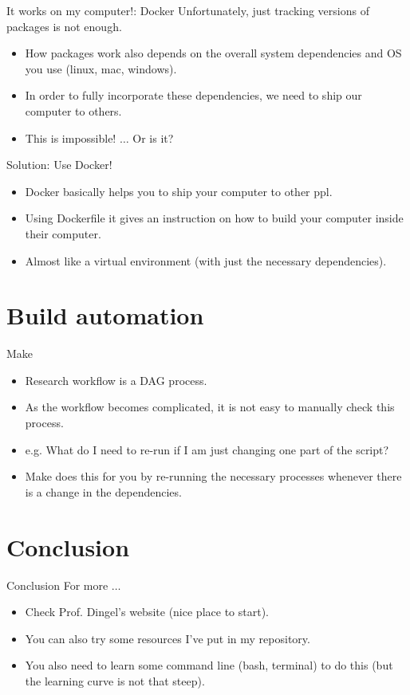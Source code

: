 \documentclass[10pt]{beamer}
\begin{document}
\begin{frame}{It works on my computer!: Docker}
Unfortunately, just tracking versions of packages is not enough.	
\begin{itemize}
	\item How packages work also depends on the overall system dependencies and OS you use (linux, mac, windows).
	\item In order to fully incorporate these dependencies, we need to ship our computer to others.
	\item This is impossible! $\ldots$ Or is it?

\end{itemize}\vspace{5mm}

Solution: Use Docker!
\begin{itemize}
	\item Docker basically helps you to ship your computer to other ppl.
	\item Using Dockerfile it gives an instruction on how to build your computer inside their computer.
	\item Almost like a virtual environment (with just the necessary dependencies).
\end{itemize}
\end{frame}

\section{Build automation}

\begin{frame}{Make}
	\begin{itemize}
		\item Research workflow is a DAG process.
		\item As the workflow becomes complicated, it is not easy to manually check this process.
		\item e.g. What do I need to re-run if I am just changing one part of the script?
		\item Make does this for you by re-running the necessary processes whenever there is a change in the dependencies.
	\end{itemize}
\end{frame}

\section{Conclusion}

\begin{frame}{Conclusion}
   For more $\ldots$ 
   \begin{itemize}
   	\item Check Prof. Dingel's website (nice place to start).
	\item You can also try some resources I've put in my repository.
	\item You also need to learn some command line (bash, terminal) to do this (but the learning curve is not that steep).
   \end{itemize}
\end{frame}
\end{document}
